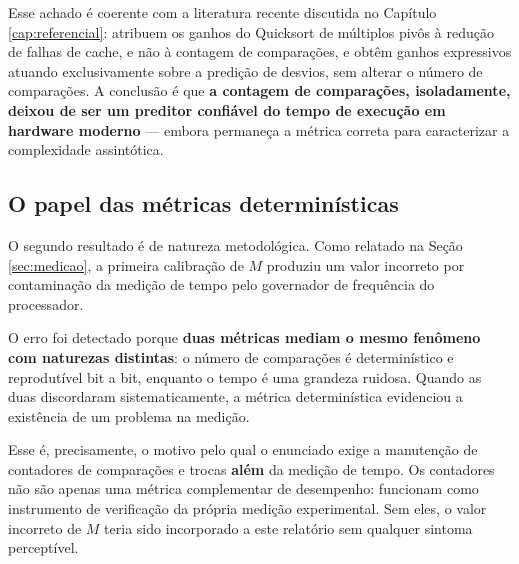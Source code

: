 Esse achado é coerente com a literatura recente discutida no Capítulo
\ref{cap:referencial}:  atribuem os ganhos do Quicksort de
múltiplos pivôs à redução de falhas de cache, e não à contagem de comparações, e
 obtêm ganhos expressivos atuando exclusivamente sobre a
predição de desvios, sem alterar o número de comparações. A conclusão é que
\textbf{a contagem de comparações, isoladamente, deixou de ser um preditor confiável
do tempo de execução em hardware moderno} --- embora permaneça a métrica correta
para caracterizar a complexidade assintótica.

\subsection{O papel das métricas determinísticas}

O segundo resultado é de natureza metodológica. Como relatado na Seção
\ref{sec:medicao}, a primeira calibração de $M$ produziu um valor incorreto por
contaminação da medição de tempo pelo governador de frequência do processador.

O erro foi detectado porque \textbf{duas métricas mediam o mesmo fenômeno com
naturezas distintas}: o número de comparações é determinístico e reprodutível bit a
bit, enquanto o tempo é uma grandeza ruidosa. Quando as duas discordaram
sistematicamente, a métrica determinística evidenciou a existência de um problema na
medição.

Esse é, precisamente, o motivo pelo qual o enunciado exige a manutenção de contadores
de comparações e trocas \textbf{além} da medição de tempo. Os contadores não são
apenas uma métrica complementar de desempenho: funcionam como instrumento de
verificação da própria medição experimental. Sem eles, o valor incorreto de $M$
teria sido incorporado a este relatório sem qualquer sintoma perceptível.
